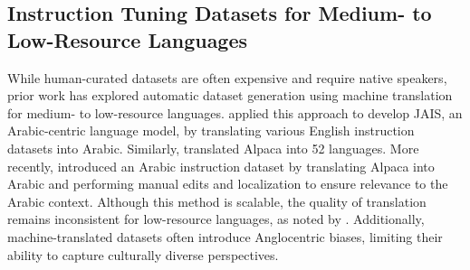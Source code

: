 
\subsection{Instruction Tuning Datasets for Medium- to Low-Resource Languages}






While human-curated datasets are often expensive and require native speakers, prior work has explored automatic dataset generation using machine translation for medium- to low-resource languages. \citet{sengupta2023jais} applied this approach to develop JAIS, an Arabic-centric language model, by translating various English instruction datasets into Arabic. Similarly, \citet{li2023bactrian} translated Alpaca \cite{taori2023stanford} into 52 languages. More recently, \citet{CIDAR2024} introduced an Arabic instruction dataset by translating Alpaca into Arabic and performing manual edits and localization to ensure relevance to the Arabic context. Although this method is scalable, the quality of translation remains inconsistent for low-resource languages, as noted by \citet{li2023bactrian}. Additionally, machine-translated datasets often introduce Anglocentric biases, limiting their ability to capture culturally diverse perspectives.


